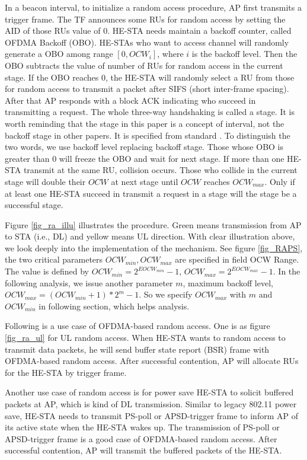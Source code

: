 In a beacon interval, to initialize a random access procedure, AP first transmits a trigger frame. 
The TF announces some RUs for random access by setting the AID of those RUs value of 0. 
HE-STA needs maintain a backoff counter, called OFDMA Backoff (OBO). 
HE-STAs who want to access channel will randomly generate a OBO among range $[0, OCW_i]$, where $i$ is the backoff level. 
Then the OBO subtracts the value of number of RUs for random access in the current stage. 
If the OBO reaches 0, the HE-STA will randomly select a RU from those for random access to transmit a packet after SIFS (short inter-frame spacing). 
After that AP responds with a block ACK indicating who succeed in transmitting a request. The whole three-way handshaking is called a stage. 
It is worth reminding that the stage in this paper is a concept of interval, not the backoff stage in other papers. 
It is specified from standard \cite{draft_ax}. To distinguish the two words, we use backoff level replacing backoff stage. 
Those whose OBO is greater than 0 will freeze the OBO and wait for next stage.  
If more than one HE-STA transmit at the same RU, collision occurs. 
Those who collide in the current stage will double their $OCW$ at next stage until $OCW$ reaches $OCW_{max}$. 
Only if at least one HE-STA succeed in transmit a request in a stage will the stage be a successful stage. 

Figure \ref{fig_ra_illu} illustrates the procedure. Green means transmission from AP to STA (i.e., DL) and yellow means UL direction. 
With clear illustration above, we look deeply into the implementation of the mechanism.
See figure \ref{fig_RAPS}, the two critical parameters $OCW_{min},OCW_{max}$ are specified in field OCW Range. 
The value is defined by $OCW_{min} = 2^{EOCW_{min}}-1$, $OCW_{max} = 2^{EOCW_{max}}-1$. 
In the following analysis, we issue another parameter $m$, maximum backoff level, $OCW_{max} = (OCW_{min}+1)*2^m-1$. So we specify $OCW_{max}$ with $m$ and $OCW_{min}$ in following section, which helps analysis.


Following is a use case of OFDMA-based random access. 
One is as figure \ref{fig_ra_ul} for UL random access. 
When HE-STA wants to random access to transmit data packets, he will send buffer state report (BSR) frame with OFDMA-based random access. 
After successful contention, AP will allocate RUs for the HE-STA by trigger frame. 


Another use case of random access is for power save HE-STA to solicit buffered packets at AP, which is kind of DL transmission.
Similar to legacy 802.11 power save, HE-STA needs to transmit PS-poll or APSD-trigger frame to inform AP of its active state when the HE-STA wakes up.
The transmission of PS-poll or APSD-trigger frame is a good case of OFDMA-based random access. After successful contention, AP will transmit the buffered packets of the HE-STA.


